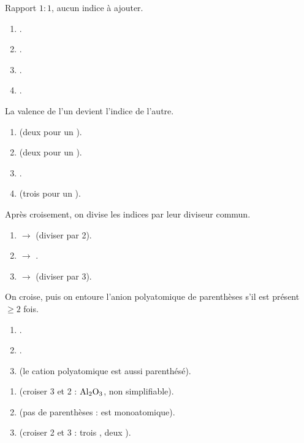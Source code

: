 \documentclass[11pt,a4paper]{article}
\begin{document}
\begin{corrige}
Rapport $1:1$, aucun indice à ajouter.
\begin{enumerate}[label=\alph*)]
  \item {}.
  \item {}.
  \item {}.
  \item {}.
\end{enumerate}
\end{corrige}

\begin{corrige}
La valence de l'un devient l'indice de l'autre.
\begin{enumerate}[label=\alph*)]
  \item {} (deux  pour un ).
  \item {} (deux  pour un ).
  \item {}.
  \item {} (trois  pour un ).
\end{enumerate}
\end{corrige}

\begin{corrige}
Après croisement, on divise les indices par leur diviseur commun.
\begin{enumerate}[label=\alph*)]
  \item {} $\to$  (diviser par 2).
  \item {} $\to$ .
  \item {} $\to$  (diviser par 3).
\end{enumerate}
\end{corrige}

\begin{corrige}
On croise, puis on entoure l'anion polyatomique de parenthèses s'il est présent $\geq 2$ fois.
\begin{enumerate}[label=\alph*)]
  \item {}.
  \item {}.
  \item {} (le cation polyatomique  est aussi parenthésé).
\end{enumerate}
\end{corrige}

\begin{corrige}
\begin{enumerate}[label=\alph*)]
  \item {} (croiser 3 et 2 : $\ce{Al2O3}$, non simplifiable).
  \item {} (pas de parenthèses :  est monoatomique).
  \item {} (croiser 2 et 3 : trois , deux ).
\end{enumerate}
\end{corrige}
\end{document}
